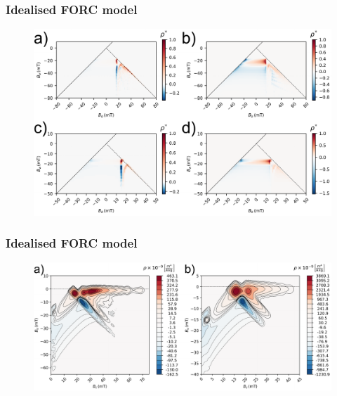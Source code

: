 \documentclass{beamer}
\begin{document}
        \begin{frame}
          \frametitle{Idealised FORC model}
          \begin{figure}[htb]
            \centering
            \includegraphics[width=\textwidth]{Chapter_02_Figure_03.pdf}
          \end{figure}
        \end{frame}

        \begin{frame}
          \frametitle{Idealised FORC model}
          \begin{figure}[htb]
            \centering
            \includegraphics[width=\textwidth]{Chapter_02_Figure_04.pdf}
          \end{figure}
        \end{frame}
\end{document}
